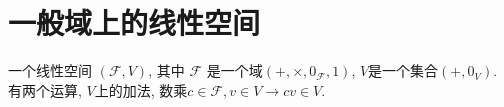 
\section{一般域上的线性空间}
一个线性空间 $(\mathcal{F}, V)$, 其中 $\mathcal{F}$ 是一个域$(+, \times , 0_{\mathcal{F}}, 1)$, $V$是一个集合$(+, 0_{V})$. 有两个运算, $V$上的加法, 数乘$c \in \mathcal{F}, v \in V \to cv \in V$.
